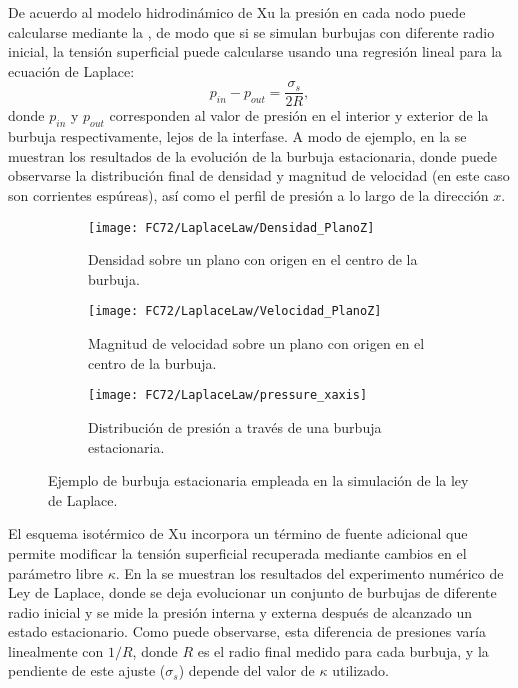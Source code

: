 De acuerdo al modelo hidrodin\'amico de Xu la presi\'on en cada nodo puede calcularse mediante la , de modo que si se simulan burbujas con diferente radio inicial, la tensi\'on superficial puede calcularse usando una regresi\'on lineal para la ecuaci\'on de Laplace:
\begin{equation}
	p_{in}-p_{out} = \dfrac{\sigma_s}{2 R},
\end{equation}
donde $p_{in}$ y $p_{out}$ corresponden al valor de presi\'on en el interior y exterior de la burbuja respectivamente, lejos de la interfase. A modo de ejemplo, en la  se muestran los resultados de la evoluci\'on de la burbuja estacionaria, donde puede observarse la distribuci\'on final de densidad y magnitud de velocidad (en este caso son corrientes esp\'ureas), as\'i como el perfil de presi\'on a lo largo de la direcci\'on $x$.
\begin{figure}[htb]
    \centering
    \begin{subfigure}[t]{0.45\textwidth}
        \centering
        \texttt{[image: FC72/LaplaceLaw/Densidad\_PlanoZ]}
        \caption{Densidad sobre un plano con origen en el centro de la burbuja.}
    \end{subfigure}
    \begin{subfigure}[t]{0.45\textwidth}
        \centering
        \texttt{[image: FC72/LaplaceLaw/Velocidad\_PlanoZ]}
        \caption{Magnitud de velocidad sobre un plano con origen en el centro de la burbuja.}
    \end{subfigure}
    \begin{subfigure}[t]{0.45\textwidth}
        \centering
        \texttt{[image: FC72/LaplaceLaw/pressure\_xaxis]}
        \caption{Distribuci\'on de presi\'on  a trav\'es de una burbuja estacionaria.}
    \end{subfigure}    
    \caption{Ejemplo de burbuja estacionaria empleada en la simulaci\'on de la ley de Laplace.}
    \label{fig:laplace_1_3D}
\end{figure}

El esquema isot\'ermico de Xu incorpora un t\'ermino de fuente adicional que permite modificar la tensi\'on superficial recuperada mediante cambios en el par\'ametro libre $\kappa$. En la  se muestran los resultados del experimento num\'erico de Ley de Laplace, donde se deja evolucionar un conjunto de burbujas de diferente radio inicial y se mide la presi\'on interna y externa despu\'es de alcanzado un estado estacionario. Como puede observarse, esta diferencia de presiones var\'ia linealmente con $1/R$, donde $R$ es el radio final medido para cada burbuja, y la pendiente de este ajuste ($\sigma_s$) depende del valor de $\kappa$ utilizado.

